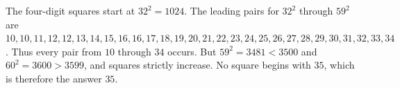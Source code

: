 The four-digit squares start at $32^2=1024$. The leading pairs for $32^2$ through $59^2$ are $10,10,11,12,12,13,14,15,16,16,17,18,19,20,21,22,23,24,25,26,27,28,29,30,31,32,33,34$. Thus every pair from $10$ through $34$ occurs. But $59^2=3481<3500$ and $60^2=3600>3599$, and squares strictly increase. No square begins with $35$, which is therefore the answer $\boxed{35}$.
